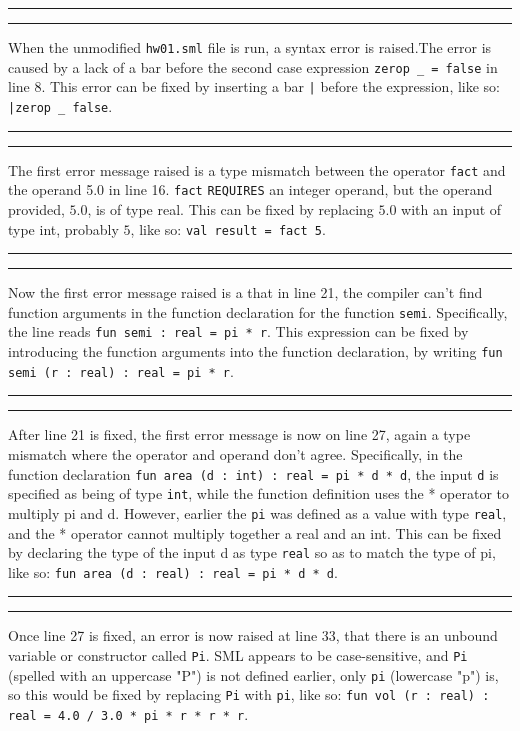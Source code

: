 \documentclass[11pt]{article}
\newcounter{questionCounter}
\newcounter{partCounter}[questionCounter]
\newenvironment{question}[2][\arabic{questionCounter}]{%
    \setcounter{partCounter}{0}%
    \vspace{.25in} \hrule \vspace{0.5em}%
        \noindent{\bf #2}%
    \vspace{0.8em} \hrule \vspace{.10in}%
    \addtocounter{questionCounter}{1}%
}{}
\begin{document}
\newpage

\begin{question}{Task 5.1}
When the unmodified \verb!hw01.sml! file is run, a syntax error is raised.The error is caused by a lack of a bar before the second case expression \verb!zerop _ = false! in line 8. This error can be fixed by inserting a bar \verb!|! before the expression, like so: \verb!|zerop _ false!.
\end{question}

\begin{question}{Task 5.2}
The first error message raised is a type mismatch between the operator \verb!fact! and the operand 5.0 in line 16. \verb!fact! \verb!REQUIRES! an integer operand, but the operand provided, $5.0$, is of type real. This can be fixed by replacing $5.0$ with an input of type int, probably $5$, like so: \verb!val result = fact 5!.
\end{question}

\begin{question}{Task 5.3}
Now the first error message raised is a that in line 21, the compiler can't find function arguments in the function declaration for the function \verb!semi!. Specifically, the line reads \verb!fun semi : real = pi * r!. This expression can be fixed by introducing the function arguments into the function declaration, by writing \verb!fun semi (r : real) : real = pi * r!.
\end{question}

\begin{question}{Task 5.4}
After line 21 is fixed, the first error message is now on line 27, again a type mismatch where the operator and operand don't agree. Specifically, in the function declaration \verb!fun area (d : int) : real = pi * d * d!, the input \verb!d! is specified as being of type \verb!int!, while the function definition uses the * operator to multiply pi and d. However, earlier the \verb!pi! was defined as a value with type \verb!real!, and the * operator cannot multiply together a real and an int. This can be fixed by declaring the type of the input d as type \verb!real! so as to match the type of pi, like so: \verb!fun area (d : real) : real = pi * d * d!. 
\end{question}

\begin{question}{Task 5.5}
Once line 27 is fixed, an error is now raised at line 33, that there is an unbound variable or constructor called \verb!Pi!. SML appears to be case-sensitive, and \verb!Pi! (spelled with an uppercase "P") is not defined earlier, only \verb!pi! (lowercase "p") is, so this would be fixed by replacing \verb!Pi! with \verb!pi!, like so: \verb!fun vol (r : real) : real = 4.0 / 3.0 * pi * r * r * r!.
\end{question}
\end{document}
